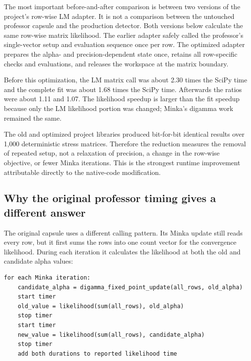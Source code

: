 \documentclass[11pt]{article}
\begin{document}
The most important before-and-after comparison is between two versions of the
project's row-wise LM adapter. It is not a comparison between the untouched
professor capsule and the production detector. Both versions below calculate
the same row-wise matrix likelihood. The earlier adapter safely called the
professor's single-vector setup and evaluation sequence once per row. The
optimized adapter prepares the alpha- and precision-dependent state once,
retains all row-specific checks and evaluations, and releases the workspace at
the matrix boundary.

\begin{table}[htbp]
\centering
\small
\caption{Controlled D-Link before-and-after result for the row-wise project
implementation.}
\label{tab:optimization-effect}
\end{table}

Before this optimization, the LM matrix call was about 2.30 times the SciPy
time and the complete fit was about 1.68 times the SciPy time. Afterwards the
ratios were about 1.11 and 1.07. The likelihood speedup is larger than the fit
speedup because only the LM likelihood portion was changed; Minka's digamma
work remained the same.

The old and optimized project libraries produced bit-for-bit identical results
over 1,000 deterministic stress matrices. Therefore the reduction measures the
removal of repeated setup, not a relaxation of precision, a change in the
row-wise objective, or fewer Minka iterations. This is the strongest runtime
improvement attributable directly to the native-code modification.

\subsection{Why the original professor timing gives a different answer}

The original capsule uses a different calling pattern. Its Minka update still
reads every row, but it first sums the rows into one count vector for the
convergence likelihood. During each iteration it calculates the likelihood at
both the old and candidate alpha values:
\begin{verbatim}
for each Minka iteration:
    candidate_alpha = digamma_fixed_point_update(all_rows, old_alpha)
    start timer
    old_value = likelihood(sum(all_rows), old_alpha)
    stop timer
    start timer
    new_value = likelihood(sum(all_rows), candidate_alpha)
    stop timer
    add both durations to reported likelihood time
\end{verbatim}
\end{document}
